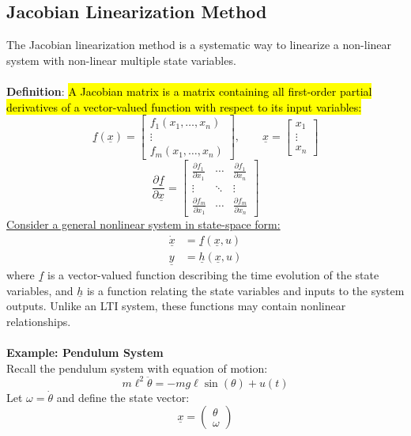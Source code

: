 ﻿\documentclass[12pt]{article}
\begin{document}
\subsection*{Jacobian Linearization Method}
The Jacobian linearization method is a systematic way to linearize a non-linear system with non-linear multiple state variables.\\\\
\textbf{Definition}: \hl{A Jacobian matrix is a matrix containing all first-order partial derivatives of a vector-valued function with respect to its input variables:}
\[
\underline{f}(\underline{x}) =
\begin{bmatrix}
f_1(x_1,\ldots,x_n) \\
\vdots \\
f_m(x_1,\ldots,x_n)
\end{bmatrix},
\qquad
\underline{x} =
\begin{bmatrix}
x_1 \\
\vdots \\
x_n
\end{bmatrix}
\]
\[
\frac{\partial \underline{f}}{\partial \underline{x}}
=
\begin{bmatrix}
\frac{\partial f_1}{\partial x_1} & \cdots & \frac{\partial f_1}{\partial x_n} \\
\vdots & \ddots & \vdots \\
\frac{\partial f_m}{\partial x_1} & \cdots & \frac{\partial f_m}{\partial x_n}
\end{bmatrix}
\]
\underline{Consider a general nonlinear system in state-space form:}
\[
\boxed{
\begin{aligned}
\dot{\underline{x}} &= \underline{f}(\underline{x},u)\\
\underline{y} &= \underline{h}(\underline{x},u)
\end{aligned}
}
\]
where $\underline{f}$ is a vector-valued function describing the time evolution of the state variables, and $\underline{h}$ is a function relating the state variables and inputs to the system outputs. Unlike an LTI system, these functions may contain nonlinear relationships.\\\\
\textbf{Example: Pendulum System}\\
Recall the pendulum system with equation of motion:
\[
m\ell^2\ddot{\theta}=-mg\ell\sin(\theta)+u(t)
\]
Let $\omega=\dot{\theta}$ and define the state vector:
\[
\underline{x}=
\begin{pmatrix}
\theta\\
\omega
\end{pmatrix}
\]
\end{document}
